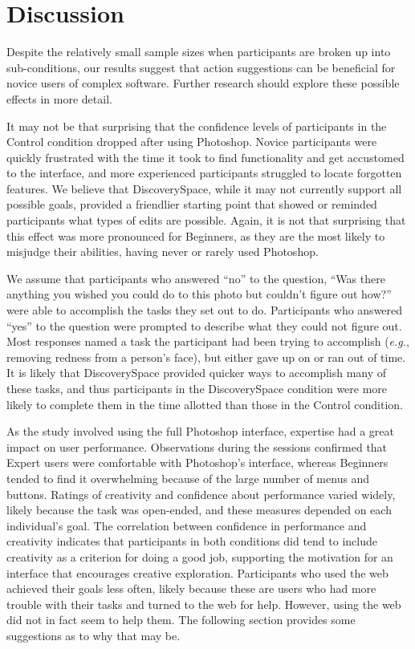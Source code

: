 \section{Discussion}
Despite the relatively small sample sizes when participants are broken up into sub-condi\-tions, our results suggest that action suggestions can be beneficial for novice users of complex software. Further research should explore these possible effects in more detail.

It may not be that surprising that the confidence levels of participants in the Control condition dropped after using Photoshop. Novice participants were quickly frustrated with the time it took to find functionality and get accustomed to the interface, and more experienced participants struggled to locate forgotten features. We believe that Discovery\-Space, while it may not currently support all possible goals, provided a friendlier starting point that showed or reminded participants what types of edits are possible. Again, it is not that surprising that this effect was more pronounced for Beginners, as they are the most likely to misjudge their abilities, having never or rarely used Photoshop.

We assume that participants who answered ``no'' to the question, ``Was there anything you wished you could do to this photo but couldn't figure out how?'' were able to accomplish the tasks they set out to do. Participants who answered ``yes'' to the question were prompted to describe what they could not figure out. Most responses named a task the participant had been trying to accomplish (\textit{e.g.}, removing redness from a person's face), but either gave up on or ran out of time. It is likely that Discovery\-Space provided quicker ways to accomplish many of these tasks, and thus participants in the Discovery\-Space condition were more likely to complete them in the time allotted than those in the Control condition. 

As the study involved using the full Photoshop interface, expertise had a great impact on user performance. Observations during the sessions confirmed that Expert users were comfortable with Photoshop's interface, whereas Beginners tended to find it overwhelming because of the large number of menus and buttons. Ratings of creativity and confidence about performance varied widely, likely because the task was open-ended, and these measures depended on each individual's goal. 
The correlation between confidence in performance and creativity indicates that participants in both conditions did tend to include creativity as a criterion for doing a good job, supporting the motivation for an interface that encourages creative exploration. Participants who used the web achieved their goals less often, likely because these are users who had more trouble with their tasks and turned to the web for help. However, using the web did not in fact seem to help them. The following section provides some suggestions as to why that may be.

